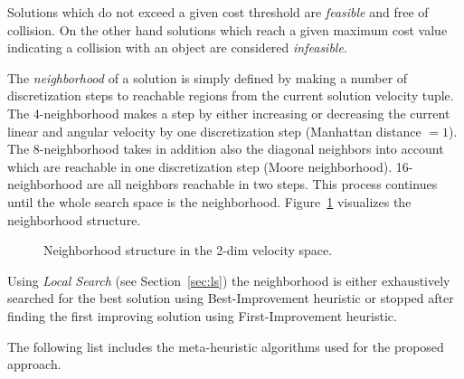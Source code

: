 Solutions which do not exceed a given cost threshold are \emph{feasible} and free of collision. 
On the other hand solutions which reach a given maximum cost value indicating a collision with an object are considered \emph{infeasible}.

The \emph{neighborhood} of a solution is simply defined by making a number of discretization steps to reachable regions from the current solution velocity tuple. 
The 4-neighborhood makes a step by either increasing or decreasing the current linear and angular velocity by one discretization step (Manhattan distance $=1$). 
The 8-neighborhood takes in addition also the diagonal neighbors into account which are reachable in one discretization step (Moore neighborhood). 
16-neighborhood are all neighbors reachable in two steps. 
This process continues until the whole search space is the neighborhood. Figure~\ref{fig:fig_nb} visualizes the neighborhood structure.
\begin{figure}[thpb]
   \footnotesize
   \centering
   \def\svgwidth{\textwidth}
        
   \caption[]{Neighborhood structure in the 2-dim velocity space.}
   \label{fig:fig_nb}
\end{figure}

Using \emph{Local Search} (see Section~\ref{sec:ls}) the neighborhood is either exhaustively searched for the best solution using Best-Improvement heuristic or stopped after finding the first improving solution using First-Improvement heuristic.

The following list includes the meta-heuristic algorithms used for the proposed approach.

